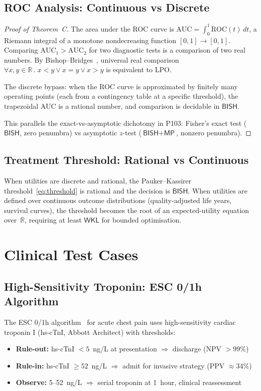 \documentclass[11pt,a4paper]{article}
\theoremstyle{plain}
\theoremstyle{definition}
\newcommand{\BISH}{\textsf{BISH}}
\newcommand{\WKL}{\textsf{WKL}}
\newcommand{\MP}{\textsf{MP}}
\newcommand{\R}{\mathbb{R}}
\begin{document}
\subsection{ROC Analysis: Continuous vs Discrete}

\begin{proof}[Proof of Theorem~C]
The area under the ROC curve is $\mathrm{AUC} = \int_0^1 \mathrm{ROC}(t)\,dt$, a Riemann integral of a monotone nondecreasing function $[0,1] \to [0,1]$.  Comparing $\mathrm{AUC}_1 > \mathrm{AUC}_2$ for two diagnostic tests is a comparison of two real numbers.  By Bishop--Bridges~\cite{bishop-bridges}, universal real comparison $\forall x, y \in \R\,.\; x < y \lor x = y \lor x > y$ is equivalent to LPO.

The discrete bypass: when the ROC curve is approximated by finitely many operating points (each from a contingency table at a specific threshold), the trapezoidal AUC is a rational number, and comparison is decidable in $\BISH$.

This parallels the exact-vs-asymptotic dichotomy in P103: Fisher's exact test ($\BISH$, zero penumbra) vs asymptotic $z$-test ($\BISH+\MP$, nonzero penumbra).
\end{proof}

\subsection{Treatment Threshold: Rational vs Continuous}

When utilities are discrete and rational, the Pauker--Kassirer threshold~\eqref{eq:threshold} is rational and the decision is $\BISH$.  When utilities are defined over continuous outcome distributions (quality-adjusted life years, survival curves), the threshold becomes the root of an expected-utility equation over~$\R$, requiring at least $\WKL$ for bounded optimisation.

\section{Clinical Test Cases}\label{sec:clinical}

\subsection{High-Sensitivity Troponin: ESC 0/1h Algorithm}

The ESC 0/1h algorithm~\cite{collet-esc2020,mueller2019} for acute chest pain uses high-sensitivity cardiac troponin I (hs-cTnI, Abbott Architect) with thresholds:
\begin{itemize}[nosep]
\item \textbf{Rule-out:} hs-cTnI $< 5$~ng/L at presentation $\Rightarrow$ discharge (NPV $> 99\%$)
\item \textbf{Rule-in:} hs-cTnI $\geq 52$~ng/L $\Rightarrow$ admit for invasive strategy (PPV $\approx 34\%$)
\item \textbf{Observe:} 5--52~ng/L $\Rightarrow$ serial troponin at 1~hour, clinical reassessment
\end{itemize}
\end{document}
